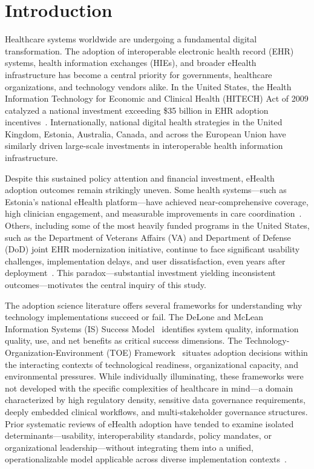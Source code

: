 \section{Introduction}

Healthcare systems worldwide are undergoing a fundamental digital transformation. The adoption of interoperable electronic health record (EHR) systems, health information exchanges (HIEs), and broader eHealth infrastructure has become a central priority for governments, healthcare organizations, and technology vendors alike. In the United States, the Health Information Technology for Economic and Clinical Health (HITECH) Act of 2009 catalyzed a national investment exceeding \$35 billion in EHR adoption incentives~\cite{adlermilstein2015hitech35b,onc2025reports}. Internationally, national digital health strategies in the United Kingdom, Estonia, Australia, Canada, and across the European Union have similarly driven large-scale investments in interoperable health information infrastructure.

Despite this sustained policy attention and financial investment, eHealth adoption outcomes remain strikingly uneven. Some health systems—such as Estonia's national eHealth platform—have achieved near-comprehensive coverage, high clinician engagement, and measurable improvements in care coordination~\cite{estonia2026ehealth,parv2012estoniahie}. Others, including some of the most heavily funded programs in the United States, such as the Department of Veterans Affairs (VA) and Department of Defense (DoD) joint EHR modernization initiative, continue to face significant usability challenges, implementation delays, and user dissatisfaction, even years after deployment~\cite{gao2025vaehr,gao2024dodehr}. This paradox—substantial investment yielding inconsistent outcomes—motivates the central inquiry of this study.

The adoption science literature offers several frameworks for understanding why technology implementations succeed or fail. The DeLone and McLean Information Systems (IS) Success Model~\cite{delone2003model} identifies system quality, information quality, use, and net benefits as critical success dimensions. The Technology-Organization-Environment (TOE) Framework~\cite{tornatzky1990processes} situates adoption decisions within the interacting contexts of technological readiness, organizational capacity, and environmental pressures. While individually illuminating, these frameworks were not developed with the specific complexities of healthcare in mind—a domain characterized by high regulatory density, sensitive data governance requirements, deeply embedded clinical workflows, and multi-stakeholder governance structures. Prior systematic reviews of eHealth adoption have tended to examine isolated determinants—usability, interoperability standards, policy mandates, or organizational leadership—without integrating them into a unified, operationalizable model applicable across diverse implementation contexts~\cite{eden2016barriers,kruse2016adoption,aguirre2019ehr}.

